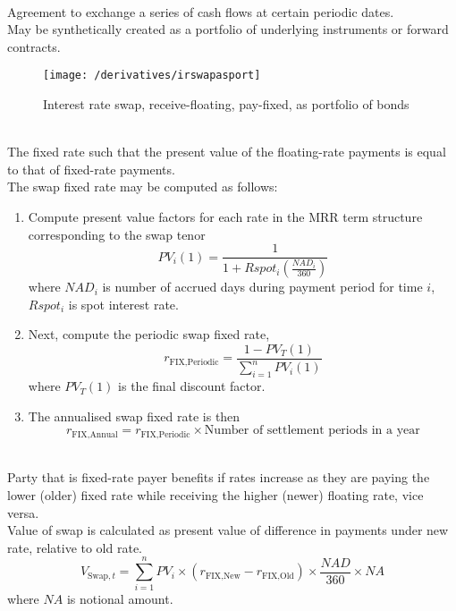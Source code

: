 \begin{remark} \\
Agreement to exchange a series of cash flows at certain periodic dates.\\
May be synthetically created as a portfolio of underlying instruments or forward contracts.
\end{remark}

\begin{figure}[H]
\centering
\texttt{[image: /derivatives/irswapasport]}
\caption{Interest rate swap, receive-floating, pay-fixed, as portfolio of bonds}
\end{figure}

\begin{remark} \\
The fixed rate such that the present value of the floating-rate payments is equal to that of fixed-rate payments.\\
The swap fixed rate may be computed as follows:
\begin{enumerate}[label=\roman*.]
\setlength{\itemsep}{0pt}
\item Compute present value factors for each rate in the MRR term structure corresponding to the swap tenor
\begin{equation}
PV_i(1) = \frac{1}{1 + Rspot_i\left(\frac{NAD_i}{360} \right)} \nonumber
\end{equation}
where $NAD_i$ is number of accrued days during payment period for time $i$, $Rspot_i$ is spot interest rate.
\item Next, compute the periodic swap fixed rate,
\begin{equation}
r_{\text{FIX}, \text{Periodic}} = \frac{1 - PV_T(1)}{\sum\limits_{i=1}^n PV_i(1)} \nonumber 
\end{equation}
where $PV_T(1)$ is the final discount factor.
\item The annualised swap fixed rate is then
\begin{equation}
r_{\text{FIX}, \text{Annual}} = r_{\text{FIX}, \text{Periodic}} \times \text{Number of settlement periods in a year} \nonumber
\end{equation}
\end{enumerate}
\end{remark}

\begin{remark} \\
Party that is fixed-rate payer benefits if rates increase as they are paying the lower (older) fixed rate while receiving the higher (newer) floating rate, vice versa.\\
Value of swap is calculated as present value of difference in payments under new rate, relative to old rate.
\begin{equation}
V_{\text{Swap}, t} = \sum\limits_{i=1}^n PV_i \times (r_{\text{FIX}, \text{New}} - r_{\text{FIX}, \text{Old}}) \times \frac{NAD}{360} \times NA \nonumber
\end{equation}
where $NA$ is notional amount.
\end{remark}

